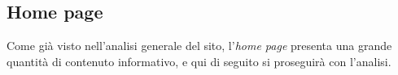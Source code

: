 \subsection{Home page}
Come già visto nell'analisi generale del sito, l'\textit{home page} presenta
una grande quantità di contenuto informativo, e qui di seguito si proseguirà con
l'analisi.
